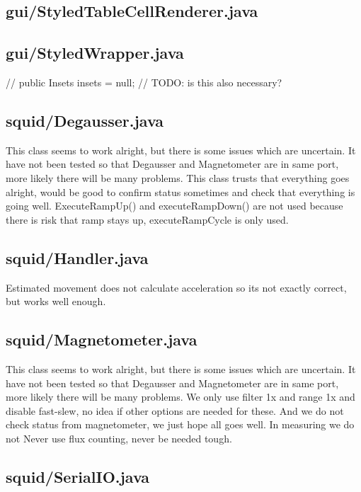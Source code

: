 \subsection{gui/StyledTableCellRenderer.java}

\subsection{gui/StyledWrapper.java}
//        public Insets insets = null; // TODO: is this also necessary?

\subsection{squid/Degausser.java}

This class seems to work alright, but there is some issues which are uncertain. It have not been tested so that Degausser and Magnetometer are in same port, more likely there will be many problems. This class trusts that everything goes alright, would be good to confirm status sometimes and check that everything is going well. ExecuteRampUp() and executeRampDown() are not used because there is risk that ramp stays up, executeRampCycle is only used.

\subsection{squid/Handler.java}

Estimated movement does not calculate acceleration so its not exactly correct, but works well enough.

\subsection{squid/Magnetometer.java}

This class seems to work alright, but there is some issues which are uncertain. It have not been tested so that Degausser and Magnetometer are in same port, more likely there will be many problems. We only use filter 1x and range 1x and disable fast-slew, no idea if other options are needed for these. And we do not check status from magnetometer, we just hope all goes well. In measuring we do not Never use flux counting, never be needed tough.

\subsection{squid/SerialIO.java}

